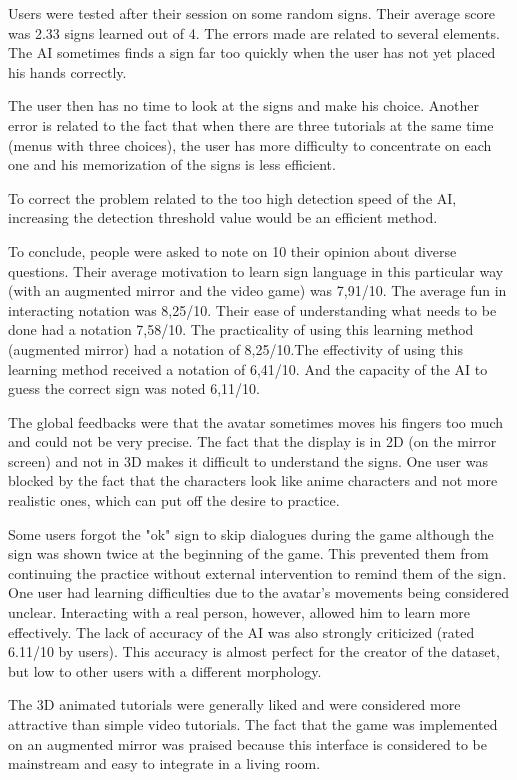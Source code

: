 Users were tested after their session on some random signs. Their average score was 2.33 signs learned out of 4. The errors made are related to several elements. The AI sometimes finds a sign far too quickly when the user has not yet placed his hands correctly. 

The user then has no time to look at the signs and make his choice. Another error is related to the fact that when there are three tutorials at the same time (menus with three choices), the user has more difficulty to concentrate on each one and his memorization of the signs is less efficient.

To correct the problem related to the too high detection speed of the AI, increasing the detection threshold value would be an efficient method.

To conclude, people were asked to note on 10 their opinion about diverse questions. Their average motivation to learn sign language in this particular way (with an augmented mirror and the video game) was 7,91/10.
The average fun in interacting notation was 8,25/10. Their ease of understanding what needs to be done had a notation 7,58/10. The practicality of using this learning method (augmented mirror) had a notation of 8,25/10.The effectivity of using this learning method received a notation of 6,41/10. And the capacity of the AI to guess the correct sign was noted 6,11/10.

The global feedbacks were that the avatar sometimes moves his fingers too much and could not be very precise. The fact that the display is in 2D (on the mirror screen) and not in 3D makes it difficult to understand the signs.
One user was blocked by the fact that the characters look like anime characters and not more realistic ones, which can put off the desire to practice.

Some users forgot the "ok" sign to skip dialogues during the game although the sign was shown twice at the beginning of the game. This prevented them from continuing the practice without external intervention to remind them of the sign. 
One user had learning difficulties due to the avatar's movements being considered unclear. Interacting with a real person, however, allowed him to learn more effectively. The lack of accuracy of the AI was also strongly criticized (rated 6.11/10 by users). This accuracy is almost perfect for the creator of the dataset, but low to other users with a different morphology.

The 3D animated tutorials were generally liked and were considered more attractive than simple video tutorials. The fact that the game was implemented on an augmented mirror was praised because this interface is considered to be mainstream and easy to integrate in a living room.


